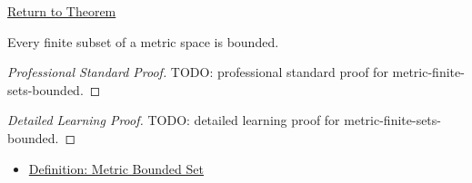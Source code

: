 \newpage
{}
\label{prf:metric-finite-sets-bounded}

\begin{remark*}[Return]
\hyperref[thm:metric-finite-sets-bounded]{Return to Theorem}
\end{remark*}

\begin{theorem*}
Every finite subset of a metric space is bounded.
\end{theorem*}

\begin{proof}[Professional Standard Proof]
\LRAProofBodyStart
TODO: professional standard proof for metric-finite-sets-bounded.
\end{proof}

\begin{proof}[Detailed Learning Proof]
\LRAProofBodyStart
TODO: detailed learning proof for metric-finite-sets-bounded.
\end{proof}

\begin{remark*}
\end{remark*}

\begin{dependencies}
\begin{itemize}
  \item \hyperref[def:metric-bounded-set]{Definition: Metric Bounded Set}
\end{itemize}
\end{dependencies}

\clearpage
